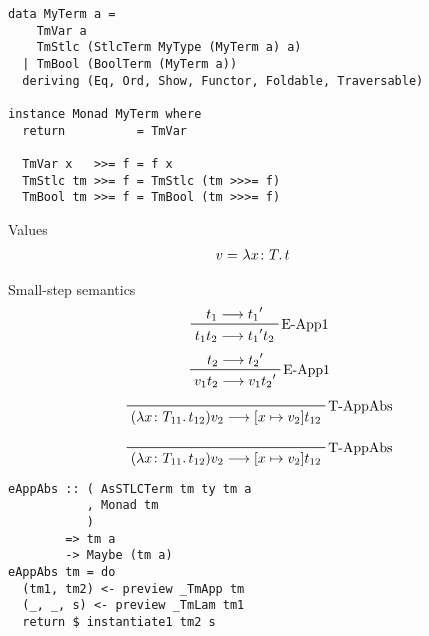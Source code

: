\documentclass{beamer}
\begin{document}
\begin{frame}[fragile]
  \begin{verbatim}
data MyTerm a =
    TmVar a
    TmStlc (StlcTerm MyType (MyTerm a) a)
  | TmBool (BoolTerm (MyTerm a))
  deriving (Eq, Ord, Show, Functor, Foldable, Traversable)

instance Monad MyTerm where
  return          = TmVar

  TmVar x   >>= f = f x
  TmStlc tm >>= f = TmStlc (tm >>>= f)
  TmBool tm >>= f = TmBool (tm >>>= f)
  \end{verbatim}  
\end{frame}

\begin{frame}[c]
  Values
  \begin{displaymath}
    \begin{aligned}
v =& \ \lambda x \colon T \ldotp t
    \end{aligned}
  \end{displaymath}
\end{frame}

\begin{frame}
  Small-step semantics
  \begin{displaymath}  
    \prftree[r]{E-App1}
    {t_1 \longrightarrow {t_1}^{\prime} }
    {t_1 t_2 \longrightarrow {t_1}^{\prime} t_2}
  \end{displaymath}  
  \begin{displaymath}  
    \prftree[r]{E-App1}
    {t_2 \longrightarrow {t_2}^{\prime} }
    {v_1 t_2 \longrightarrow v_1 {t_2}^{\prime}}
  \end{displaymath}  
  \begin{displaymath}  
    \prftree[r]{T-AppAbs}
    {(\lambda x \colon T_{11} \ldotp t_{12})v_2 \longrightarrow [x \mapsto v_2]t_{12}}
  \end{displaymath}  
\end{frame}

\begin{frame}[fragile]
  \begin{displaymath}  
    \prftree[r]{T-AppAbs}
    {(\lambda x \colon T_{11} \ldotp t_{12})v_2 \longrightarrow [x \mapsto v_2]t_{12}}
  \end{displaymath}  
  \begin{verbatim}
eAppAbs :: ( AsSTLCTerm tm ty tm a
           , Monad tm 
           )
        => tm a
        -> Maybe (tm a)
eAppAbs tm = do
  (tm1, tm2) <- preview _TmApp tm
  (_, _, s) <- preview _TmLam tm1
  return $ instantiate1 tm2 s
  \end{verbatim}  
\end{frame}
\end{document}
